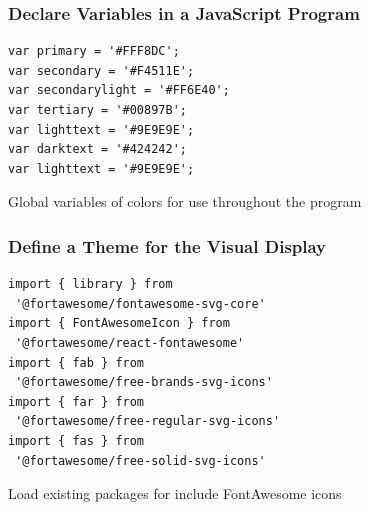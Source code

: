 \documentclass[14pt,aspectratio=169]{beamer}
\begin{document}
%
\begin{frame}[fragile]
  \frametitle{Declare Variables in a JavaScript Program}
  \normalsize
  \hspace*{.2in}
  \begin{minipage}{6in}
    \vspace*{.2in}
    \begin{verbatim}
var primary = '#FFF8DC';
var secondary = '#F4511E';
var secondarylight = '#FF6E40';
var tertiary = '#00897B';
var lighttext = '#9E9E9E';
var darktext = '#424242';
var lighttext = '#9E9E9E';
    \end{verbatim}
  \end{minipage}
  \vspace*{.1in}
  \begin{center}
    Global variables of colors for use throughout the program \\
  \end{center}
\end{frame}

%
\begin{frame}[fragile]
  \frametitle{Define a Theme for the Visual Display}
  \normalsize
  \hspace*{-.05in}
  \begin{minipage}{6in}
    \vspace*{.1in}
    \begin{verbatim}
import { library } from
 '@fortawesome/fontawesome-svg-core'
import { FontAwesomeIcon } from
 '@fortawesome/react-fontawesome'
import { fab } from
 '@fortawesome/free-brands-svg-icons'
import { far } from
 '@fortawesome/free-regular-svg-icons'
import { fas } from
 '@fortawesome/free-solid-svg-icons'
    \end{verbatim}
  \end{minipage}
  \vspace*{.05in}
  \begin{center}
     Load existing packages for include FontAwesome icons
  \end{center}
\end{frame}
\end{document}
